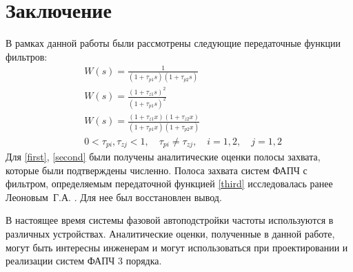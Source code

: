 \documentclass[a4paper,article,14pt]{extarticle}
\begin{document}
\pagebreak
\section{Заключение}
В рамках данной работы были рассмотрены следующие передаточные функции фильтров: 
 \begin{align}
&W(s) = \frac{1}{(1+\tau_{p1}s)(1+\tau_{p2}s)}\label{first}\\[5pt]
&W(s) = \frac{(1+\tau_{z1}s)^2}{(1+\tau_{p1}s)^2}\label{second}\\[5pt]
&W(s) = \frac{(1+\tau_{z1}x)(1+\tau_{z2}x)}{(1+\tau_{p1}x)(1+\tau_{p2}x)}\label{third}\\
&0<\tau_{pi},\tau_{zj} < 1, \quad \tau_{pi} \neq \tau_{zj}, \quad i=1,2, \quad j=1,2
 \end{align}
 Для \eqref{first}, \eqref{second} были получены аналитические оценки полосы захвата, которые были подтверждены численно. Полоса захвата систем ФАПЧ с фильтром, определяемым передаточной функцией \eqref{third} исследовалась ранее Леоновым~Г.\:А. \cite{kuznetsov}. Для нее был восстановлен вывод. 
 
 В настоящее время системы фазовой автоподстройки частоты используются в различных устройствах. Аналитические оценки, полученные в данной работе, могут быть интересны инженерам и могут использоваться при проектировании и реализации систем ФАПЧ 3 порядка.
 
 \pagebreak
{}







 
\end{document}
